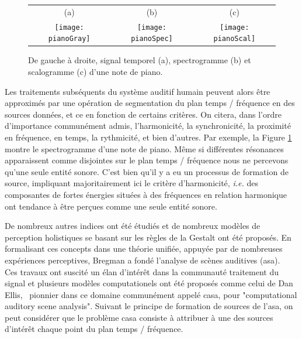 \begin{figure}[t]
  \footnotesize
  \begin{tabular}{ccc}
    (a) & (b) & (c)  \\
    \texttt{[image: pianoGray]} &
    \texttt{[image: pianoSpec]} &
    \texttt{[image: pianoScal]}  \\
  \end{tabular}
  \caption{De gauche à droite, signal temporel (a), spectrogramme (b) et scalogramme (c) d'une note de piano.}
  \label{fig:piano}
\end{figure}

Les traitements subséquents du système auditif humain peuvent alors être approximés par une opération de segmentation du plan temps / fréquence en des sources données, et ce en fonction de certains critères.  On citera, dans l'ordre d'importance communément admis, l'harmonicité, la synchronicité, la proximité en fréquence, en temps, la rythmicité, et bien d'autres. Par exemple, la Figure \ref{fig:piano} montre le spectrogramme d'une note de piano. Même si différentes résonances apparaissent comme disjointes sur le plan temps / fréquence nous ne percevons qu'une seule entité sonore. C'est bien qu'il y a eu un processus de formation de source, impliquant majoritairement ici le critère d'harmonicité, \textit{i.e.} des composantes de fortes énergies situées à des fréquences en relation harmonique ont tendance à être perçues comme une seule entité sonore.



De nombreux autres indices ont été étudiés et de nombreux modèles de perception holistiques se basant sur les règles de la Gestalt\cite{koffka2013principles} ont été proposés. En formalisant ces concepts dans une théorie unifiée, appuyée par de nombreuses expériences perceptives, Bregman a fondé l'analyse de scènes auditives (asa).~\cite{bregman1994auditory} Ces travaux ont suscité un élan d'intérêt dans la communauté traitement du signal et plusieurs modèles computationels ont été proposés comme celui de Dan Ellis,~\cite{ellis1996prediction} pionnier dans ce domaine communément appelé casa, pour "computational auditory scene analysis". Suivant le principe de formation de sources de l'asa, on peut considérer que le problème casa consiste à attribuer à une des sources d'intérêt chaque point du plan temps / fréquence.

